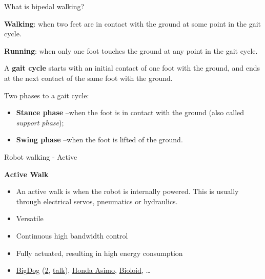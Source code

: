 \documentclass[compress]{beamer}
\begin{document}

\begin{frame}{What is bipedal walking?}

    \textbf{Walking}: when two feet are in contact with the ground at some point in the gait
    cycle.

    \textbf{Running}: when only one foot touches the ground at any point in the
    gait cycle.

    A \textbf{gait cycle} starts with an initial contact of one foot with the
    ground, and ends at the next contact of the same foot with the ground.

    Two phases to a gait cycle:

    \begin{itemize}

        \item \textbf{Stance phase} --when the foot is in contact with the ground
            (also called \emph{support phase});
        \item \textbf{Swing phase} --when the foot is lifted of the ground.
    \end{itemize}

\end{frame}

\begin{frame}{Robot walking - Active}

    \textbf{Active Walk}

    \begin{itemize}

        \item An active walk is when the robot is internally powered. This is
            usually through electrical servos, pneumatics or hydraulics.
        \item Versatile
        \item Continuous high bandwidth control
        \item Fully actuated, resulting in high energy consumption
        \item \href{http://www.youtube.com/watch?v=cHJJQ0zNNOM}{BigDog}
            (\href{http://www.youtube.com/watch?v=VXJZVZFRFJc}{2},
            \href{http://www.youtube.com/watch?v=-Bi-tPO0OPs}{talk}),
            \href{http://www.youtube.com/watch?v=Q3C5sc8b3xM}{Honda Asimo},
            \href{http://www.youtube.com/watch?v=KaIfZW7vCGI\&feature=related}{Bioloid},
            \ldots{}
    \end{itemize}

\end{frame}
\end{document}
